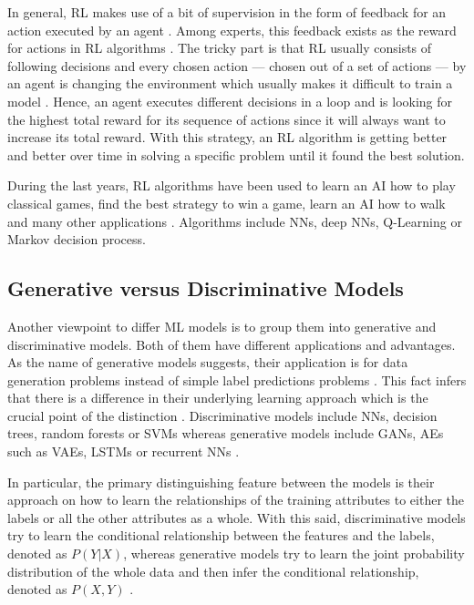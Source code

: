 \documentclass[MGS,Master,english]{twbook}%
\begin{document}
In general, \ac{RL} makes use of a bit of supervision in the form of feedback for an action executed by an agent \cite{ml::book::statistics}. Among experts, this feedback exists as the reward for actions in \ac{RL} algorithms \cite{ml::book::statistics}.  The tricky part is that \ac{RL} usually consists of following decisions and every chosen action — chosen out of a set of actions — by an agent is changing the environment which usually makes it difficult to train a model \cite{ml::book::statistics}. Hence, an agent executes different decisions in a loop and is looking for the highest total reward for its sequence of actions since it will always want to increase its total reward. \cite{ai::book} With this strategy, an \ac{RL} algorithm is getting better and better over time in solving a specific problem until it found the best solution.

During the last years, \ac{RL} algorithms have been used to learn an \ac{AI} how to play classical games, find the best strategy to win a game, learn an \ac{AI} how to walk and many other applications \cite{ml::book::algorithms}. Algorithms include \acp{NN}, deep \acp{NN}, Q-Learning or Markov decision process. \cite{ml::book::statistics}

\subsection{Generative versus Discriminative Models}
Another viewpoint to differ \ac{ML} models is to group them into generative and discriminative models. Both of them have different applications and advantages. As the name of generative models suggests, their application is for data generation problems instead of simple label predictions problems \cite{ml::book::nnProgrammingTF}. This fact infers that there is a difference in their underlying learning approach which is the crucial point of the distinction \cite{ml::book::nnProgrammingTF}. Discriminative models include \acp{NN}, decision trees, random forests or \acp{SVM} whereas generative models include \acp{GAN}, \acp{AE} such as \acp{VAE}, \acp{LSTM} or recurrent \acp{NN} \cite{ml::book::nnProgrammingTF}. 

In particular, the primary distinguishing feature between the models is their approach on how to learn the relationships of the training attributes to either the labels or all the other attributes as a whole. With this said, discriminative models try to learn the conditional relationship between the features and the labels, denoted as $P(Y|X)$, whereas generative models try to learn the joint probability distribution of the whole data and then infer the conditional relationship, denoted as $P(X,Y)$ \cite{ml::book::nnProgrammingTF}.
\end{document}
